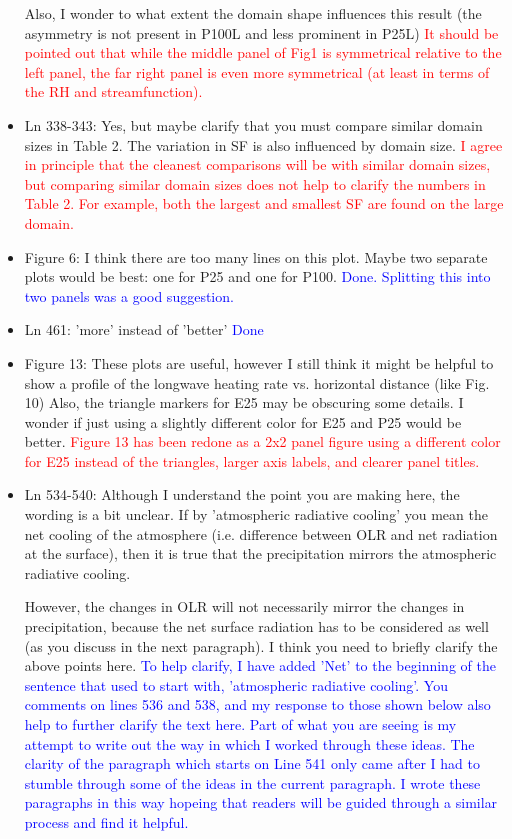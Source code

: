 \documentclass[draft]{agujournal2019}
\begin{document}
\begin{itemize}
Also, I wonder to what extent the domain shape influences 
  this result (the asymmetry is not present in P100L and less prominent in P25L)
  \textcolor{red}{It should be pointed out that while the middle panel of Fig1 is symmetrical relative to the left panel, 
  the far right panel is even more symmetrical (at least in terms of the RH and streamfunction).}
  
  \item Ln 338-343: Yes, but maybe clarify that you must compare similar domain sizes in Table 2. The variation in SF is also influenced by domain size. 
  \textcolor{red}{I agree in principle that the cleanest comparisons will be with similar domain sizes, but comparing similar domain sizes does not help to clarify the numbers in Table 2.  For example, both the largest and smallest SF are found on the large domain.  }
  
  \item Figure 6: I think there are too many lines on this plot. Maybe two separate plots would be best: one for P25 and one for P100.
  \textcolor{blue}{Done.  Splitting this into two panels was a good suggestion.}
  
  \item Ln 461: 'more' instead of 'better'
  \textcolor{blue}{Done}
  
  \item Figure 13: These plots are useful, however I still think it might be helpful to show a profile of the longwave heating rate vs. horizontal distance (like Fig. 10)
%
Also, the triangle markers for E25 may be obscuring some details. 
I wonder if just using a slightly different color for E25 and P25 would be better.
\textcolor{red}{Figure 13 has been redone as a 2x2 panel figure using a different color for E25 instead of the triangles, larger axis labels, and clearer panel titles.}
  
  \item Ln 534-540: Although I understand the point you are making here, the wording is a bit unclear. If by 'atmospheric radiative cooling' you mean the net cooling of the atmosphere (i.e. difference between OLR and net radiation at the surface), then it is true that the precipitation mirrors the atmospheric radiative cooling.  
  
However, the changes in OLR will not necessarily mirror the changes in precipitation, because the net surface radiation has to be considered as well (as you discuss in the next paragraph). 
%
I think you need to briefly clarify the above points here.
  \textcolor{blue}{To help clarify, I have added 'Net' to the beginning of the sentence that used to start with, 'atmospheric radiative cooling'.  You comments on lines 536 and 538, and my response to those shown below also help to further clarify the text here.
  Part of what you are seeing is my attempt to write out the way in which I worked through these ideas.  The clarity of the paragraph which starts on Line 541 only came after I had to stumble through some of the ideas in the current paragraph.  I 
  wrote these paragraphs in this way  
  hopeing that readers will be guided through a similar process and find it helpful.}
  

\end{itemize}
\end{document}
